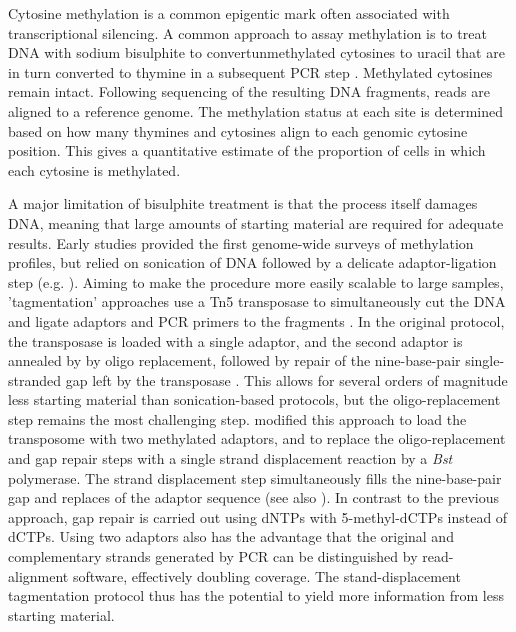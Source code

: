 \documentclass[12pt,longbibliography]{article}
\begin{document}
Cytosine methylation is a common epigentic mark often associated with transcriptional silencing.
A common approach to assay methylation is to treat DNA with sodium bisulphite to convertunmethylated cytosines to uracil that are in turn converted to thymine in a subsequent PCR step \parencite{clark1994high}.
Methylated cytosines remain intact.
Following sequencing of the resulting DNA fragments, reads are aligned to a reference genome.
The methylation status at each site is determined based on how many thymines and cytosines align to each genomic cytosine position.
This gives a quantitative estimate of the proportion of cells in which each cytosine is methylated.

A major limitation of bisulphite treatment is that the process itself damages DNA, meaning that large amounts of starting material are required for adequate results.
Early studies provided the first genome-wide surveys of methylation profiles, but relied on sonication of DNA followed by a delicate adaptor-ligation step (e.g. \cite{meissner2005reduced, cokus2008shotgun, lister2009human}).
Aiming to make the procedure more easily scalable to large samples, 'tagmentation' approaches use a Tn5 transposase to simultaneously cut the DNA and ligate adaptors and PCR primers to the fragments \parencite{wang2013tagmentation}.
In the original protocol, the transposase is loaded with a single adaptor, and the second adaptor is annealed by by oligo replacement, followed by repair of the nine-base-pair single-stranded gap left by the transposase \parencite{adey2012ultra}.
This allows for several orders of magnitude less starting material than sonication-based protocols, but the oligo-replacement step remains the most challenging step.
\textcite{lu2015improved} modified this approach to load the transposome with two methylated adaptors, and to replace the oligo-replacement and gap repair steps with a single strand displacement reaction by a \textit{Bst} polymerase.
The strand displacement step simultaneously fills the nine-base-pair gap and replaces of the adaptor sequence (see also \cite{weichenhan2018tagmentation, suzuki2018whole}).
In contrast to the previous approach, gap repair is carried out using dNTPs with 5-methyl-dCTPs instead of dCTPs.
Using two adaptors also has the advantage that the original and complementary strands generated by PCR can be distinguished by read-alignment software, effectively doubling coverage. 
The stand-displacement tagmentation protocol thus has the potential to yield more information from less starting material.
\end{document}
